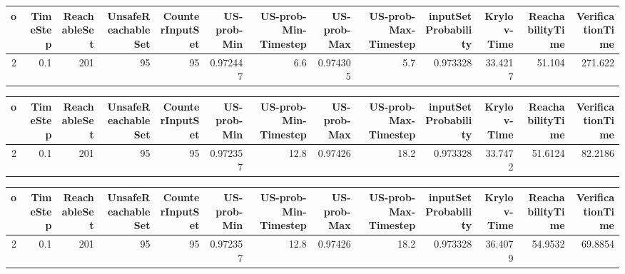\begin{tabular}{rrrrrrrrrrrrr}
\hline
   o &   TimeStep &   ReachableSet &   UnsafeReachableSet &   CounterInputSet &   US-prob-Min &   US-prob-Min-Timestep &   US-prob-Max &   US-prob-Max-Timestep &   inputSet Probability &   Krylov-Time &   ReachabilityTime &   VerificationTime \\
\hline
   2 &        0.1 &            201 &                   95 &                95 &      0.972447 &                    6.6 &      0.974305 &                    5.7 &               0.973328 &       33.4217 &             51.104 &            271.622 \\
\hline
\end{tabular}
\begin{tabular}{rrrrrrrrrrrrr}
\hline
   o &   TimeStep &   ReachableSet &   UnsafeReachableSet &   CounterInputSet &   US-prob-Min &   US-prob-Min-Timestep &   US-prob-Max &   US-prob-Max-Timestep &   inputSet Probability &   Krylov-Time &   ReachabilityTime &   VerificationTime \\
\hline
   2 &        0.1 &            201 &                   95 &                95 &      0.972357 &                   12.8 &       0.97426 &                   18.2 &               0.973328 &       33.7472 &            51.6124 &            82.2186 \\
\hline
\end{tabular}
\begin{tabular}{rrrrrrrrrrrrr}
\hline
   o &   TimeStep &   ReachableSet &   UnsafeReachableSet &   CounterInputSet &   US-prob-Min &   US-prob-Min-Timestep &   US-prob-Max &   US-prob-Max-Timestep &   inputSet Probability &   Krylov-Time &   ReachabilityTime &   VerificationTime \\
\hline
   2 &        0.1 &            201 &                   95 &                95 &      0.972357 &                   12.8 &       0.97426 &                   18.2 &               0.973328 &       36.4079 &            54.9532 &            69.8854 \\
\hline
\end{tabular}
